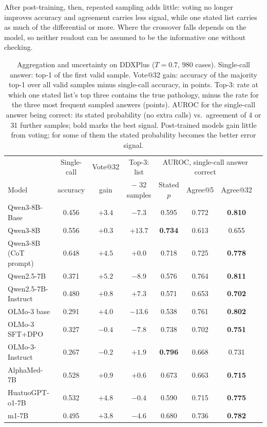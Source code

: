 \documentclass[11pt]{article}
\begin{document}
After post-training, then, repeated sampling adds little: voting no longer improves accuracy and agreement carries less signal, while one stated list carries as much of the differential or more. Where the crossover falls depends on the model, so neither readout can be assumed to be the informative one without checking.

\begin{table}[t]
\centering\small
\setlength{\tabcolsep}{4pt}
\begin{tabular}{lccccccc}
\toprule
 & Single-call & Vote@32 & Top-3: list & \multicolumn{3}{c}{AUROC, single-call answer correct} \\
Model & accuracy & gain & $-$ 32 samples & Stated $p$ & Agree@5 & Agree@32 \\
\midrule
Qwen3-8B-Base & 0.456 & $+3.4$ & $-7.3$ & 0.595 & 0.772 & \textbf{0.810} \\
Qwen3-8B & 0.556 & $+0.3$ & $+13.7$ & \textbf{0.734} & 0.613 & 0.655 \\
Qwen3-8B (CoT prompt) & 0.648 & $+4.5$ & $+0.0$ & 0.718 & 0.725 & \textbf{0.778} \\
Qwen2.5-7B & 0.371 & $+5.2$ & $-8.9$ & 0.576 & 0.764 & \textbf{0.811} \\
Qwen2.5-7B-Instruct & 0.480 & $+0.8$ & $+7.3$ & 0.571 & 0.653 & \textbf{0.702} \\
\midrule
OLMo-3 base & 0.291 & $+4.0$ & $-13.6$ & 0.538 & 0.761 & \textbf{0.802} \\
OLMo-3 SFT+DPO & 0.327 & $-0.4$ & $-7.8$ & 0.738 & 0.702 & \textbf{0.751} \\
OLMo-3-Instruct & 0.267 & $-0.2$ & $+1.9$ & \textbf{0.796} & 0.668 & 0.731 \\
\midrule
AlphaMed-7B & 0.528 & $+0.9$ & $+0.6$ & 0.673 & 0.663 & \textbf{0.715} \\
HuatuoGPT-o1-7B & 0.532 & $+4.8$ & $-0.4$ & 0.590 & 0.715 & \textbf{0.775} \\
m1-7B & 0.495 & $+3.8$ & $-4.6$ & 0.680 & 0.736 & \textbf{0.782} \\
\bottomrule
\end{tabular}
\caption{Aggregation and uncertainty on DDXPlus ($T{=}0.7$, 980 cases). Single-call answer: top-1 of the first valid sample. Vote@32 gain: accuracy of the majority top-1 over all valid samples minus single-call accuracy, in points. Top-3: rate at which one stated list's top three contains the true pathology, minus the rate for the three most frequent sampled answers (points). AUROC for the single-call answer being correct: its stated probability (no extra calls) vs.\ agreement of 4 or 31 further samples; bold marks the best signal. Post-trained models gain little from voting; for some of them the stated probability becomes the better error signal.}
\label{tab:consequences}
\end{table}
\end{document}
